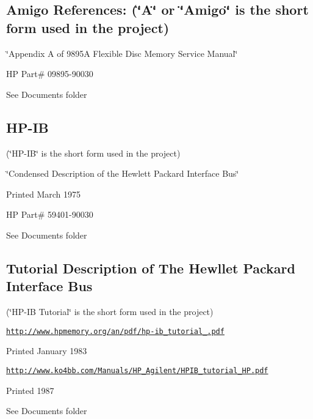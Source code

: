 \subsection*{Amigo References\+: (\char`\"{}\+A\char`\"{} or \char`\"{}\+Amigo\char`\"{} is the short form used in the project)}


\begin{DoxyItemize}
\item \char`\"{}\+Appendix A of 9895\+A Flexible Disc Memory Service Manual\char`\"{}
\item HP Part\# 09895-\/90030
\item See Documents folder
\end{DoxyItemize}

\subsection*{H\+P-\/\+IB}


\begin{DoxyItemize}
\item (\char`\"{}\+H\+P-\/\+I\+B\char`\"{} is the short form used in the project)
\item \char`\"{}\+Condensed Description of the Hewlett Packard Interface Bus\char`\"{}
\item Printed March 1975
\item HP Part\# 59401-\/90030
\item See Documents folder
\end{DoxyItemize}

\subsection*{Tutorial Description of The Hewllet Packard Interface Bus}


\begin{DoxyItemize}
\item (\char`\"{}\+H\+P-\/\+I\+B Tutorial\char`\"{} is the short form used in the project)
\item \href{http://www.hpmemory.org/an/pdf/hp-ib_tutorial_1980.pdf}{\tt http\+://www.\+hpmemory.\+org/an/pdf/hp-\/ib\+\_\+tutorial\+\_.\+pdf}
\item Printed January 1983
\item \href{http://www.ko4bb.com/Manuals/HP_Agilent/HPIB_tutorial_HP.pdf}{\tt http\+://www.\+ko4bb.\+com/\+Manuals/\+H\+P\+\_\+\+Agilent/\+H\+P\+I\+B\+\_\+tutorial\+\_\+\+H\+P.\+pdf}
\item Printed 1987
\item See Documents folder
\end{DoxyItemize}

